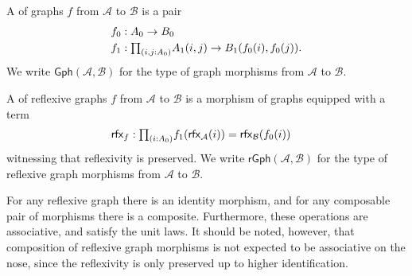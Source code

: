 \begin{defn}
A  of graphs $f$ from $\mathcal{A}$ to $\mathcal{B}$ is a pair
\begin{align*}
\pts{f} & : \pts{A} \to \pts{B} \\
\edg{f} & : \prd{i,j:\pts{A}} \edg{A}(i,j)\to \edg{B}(\pts{f}(i),\pts{f}(j)).
\end{align*}
We write $\mathsf{Gph}(\mathcal{A},\mathcal{B})$ for the type of graph morphisms from $\mathcal{A}$ to $\mathcal{B}$.

A  of reflexive graphs $f$ from $\mathcal{A}$ to $\mathcal{B}$ is a morphism of graphs equipped with a term
\begin{align*}
\rfx{f} & : \prd{i:\pts{A}} \edg{f}(\rfx{\mathcal{A}}(i))= \rfx{\mathcal{B}}(\pts{f}(i))
\end{align*}
witnessing that reflexivity is preserved. We write $\mathsf{rGph}(\mathcal{A},\mathcal{B})$ for the type of reflexive graph morphisms from $\mathcal{A}$ to $\mathcal{B}$.
\end{defn}

For any reflexive graph there is an identity morphism, and for any composable pair of morphisms there is a composite. Furthermore, these operations are associative, and satisfy the unit laws. It should be noted, however, that composition of reflexive graph morphisms is not expected to be associative on the nose, since the reflexivity is only preserved up to higher identification.

